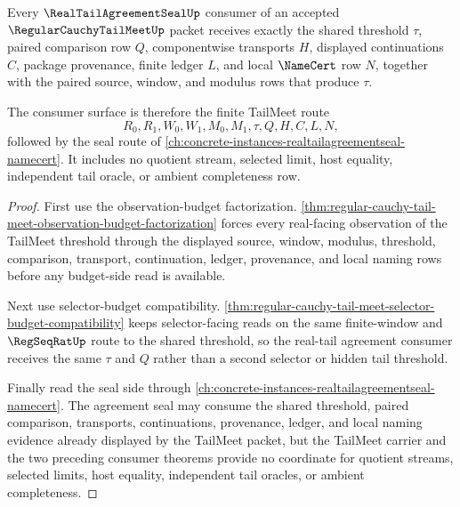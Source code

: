 \begin{theorem}
\label{thm:regular-cauchy-tail-meet-real-tail-agreement-consumer-surface}
Every $\RealTailAgreementSealUp$ consumer of an accepted $\RegularCauchyTailMeetUp$ packet receives exactly the shared threshold $\tau$, paired comparison row $Q$, componentwise transports $H$, displayed continuations $C$, package provenance, finite ledger $L$, and local $\NameCert$ row $N$, together with the paired source, window, and modulus rows that produce $\tau$.

The consumer surface is therefore the finite TailMeet route
$$
R_0,R_1,W_0,W_1,M_0,M_1,\tau,Q,H,C,L,N,
$$
followed by the seal route of \autoref{ch:concrete-instances-realtailagreementseal-namecert}. It includes no quotient stream, selected limit, host equality, independent tail oracle, or ambient completeness row.
\end{theorem}
\begin{proof}
First use the observation-budget factorization. \autoref{thm:regular-cauchy-tail-meet-observation-budget-factorization} forces every real-facing observation of the TailMeet threshold through the displayed source, window, modulus, threshold, comparison, transport, continuation, ledger, provenance, and local naming rows before any budget-side read is available.

Next use selector-budget compatibility. \autoref{thm:regular-cauchy-tail-meet-selector-budget-compatibility} keeps selector-facing reads on the same finite-window and $\RegSeqRatUp$ route to the shared threshold, so the real-tail agreement consumer receives the same $\tau$ and $Q$ rather than a second selector or hidden tail threshold.

Finally read the seal side through \autoref{ch:concrete-instances-realtailagreementseal-namecert}. The agreement seal may consume the shared threshold, paired comparison, transports, continuations, provenance, ledger, and local naming evidence already displayed by the TailMeet packet, but the TailMeet carrier and the two preceding consumer theorems provide no coordinate for quotient streams, selected limits, host equality, independent tail oracles, or ambient completeness.
\end{proof}


